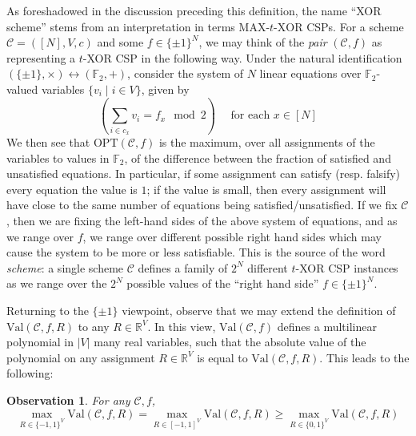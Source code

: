 \documentclass[11pt]{article}
\newtheorem{observation}{Observation}
\newcommand{\dash}{\text{-}}
\newcommand{\Opt}{\mathrm{OPT}}
\begin{document}
As foreshadowed in the discussion preceding this definition, the name ``XOR scheme'' stems from an interpretation in terms $\mathrm{MAX}\dash t\dash\mathrm{XOR}$ CSPs. For a scheme $\mathcal{C}= ([N], V,c)$ and some $f \in \{\pm 1\}^N$, we may think of the \emph{pair} $(\mathcal{C},f)$ as representing a $t$-XOR CSP in the following way. Under the natural identification $(\{\pm 1\},\times) \leftrightarrow (\mathbb{F}_2,+)$, consider the system of $N$ linear equations over $\mathbb{F}_2$-valued variables $\{v_i \mid i \in V\}$, given by
\[
(\sum_{i \in c_x} v_i  = f_x \mod 2 )\quad \text{ for each }x \in [N]
\]
We then see that $\Opt(\mathcal{C},f)$ is the maximum, over all assignments of the variables to values in $\mathbb{F}_2$, of the difference between the fraction of satisfied and unsatisfied equations.  In particular, if some assignment can satisfy (resp. falsify) every equation the value is $1$; if the value is small, then every assignment will have close to the same number of equations being satisfied/unsatisfied. 
If we fix $\mathcal{C}$, then we are fixing the left-hand sides of the above system of equations, and as we range over $f$, we range over different possible right hand sides which may cause the system to be more or less satisfiable. This is the source of the word \emph{scheme}: a single scheme $\mathcal{C}$ defines a family of $2^N$ different $t$-XOR CSP instances as we range over the $2^N$ possible values of the ``right hand side'' $f\in \{\pm 1\}^N$.


Returning to the $\{\pm 1\}$ viewpoint, observe that we may extend the definition of $\mathrm{Val}(\mathcal{C},f,R)$ to any $R \in \mathbb{R}^V$. In this view, $\mathrm{Val}(\mathcal{C},f)$ defines a multilinear polynomial in $|V|$ many real variables, such that the absolute value of the polynomial on any assignment $R \in \mathbb{R}^V$ is equal to $\mathrm{Val}(\mathcal{C},f,R)$. This leads to the following:
\begin{observation}\label{obs:multilin}
For any $\mathcal{C},f$,
\[
\max_{R\in \{-1,1\}^V} \mathrm{Val} (\mathcal{C},f,R) = \max_{R\in [-1,1]^V} \mathrm{Val} (\mathcal{C},f,R) \geq \max_{R\in \{0,1\}^V} \mathrm{Val} (\mathcal{C},f,R) 
\]
\end{observation}
\end{document}
